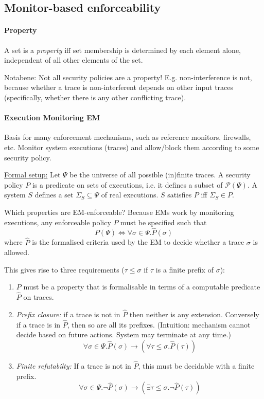 \subsection{Monitor-based enforceability}

\paragraph{Property} A set is a \emph{property} iff set membership is determined by each element alone, independent of all other elements of the set.

Notabene: Not all security policies are a property! E.g. non-interference is not, because whether a trace is non-interferent depends on other input traces (specifically, whether there is any other conflicting trace).

\paragraph{Execution Monitoring EM} Basis for many enforcement mechanisms, such as reference monitors, firewalls, etc. Monitor system executions (traces) and allow/block them according to some security policy.

\underline{Formal setup:}
Let $\Psi$ be the universe of all possible (in)finite traces. A security policy $P$ is a predicate on sets of executions, i.e. it defines a subset of $\mathcal{P}(\Psi)$. A system $S$ defines a set $\Sigma_S \subseteq \Psi$ of real executions. $S$ satisfies $P$ iff $\Sigma_S \in P$.

Which properties are EM-enforceable? Because EMs work by monitoring executions, any enforceable policy $P$ must be specified such that
$$ P(\Psi) \Leftrightarrow \forall \sigma \in \Psi . \hat{P}(\sigma) $$
where $\hat{P}$ is the formalised criteria used by the EM to decide whether a trace $\sigma$ is allowed.

This gives rise to three requirements ($\tau \leq \sigma$ if $\tau$ is a finite prefix of $\sigma$):
\begin{enumerate}
    \item $P$ must be a property that is formalisable in terms of a computable predicate $\hat{P}$ on traces.
    \item \emph{Prefix closure:} if a trace is not in $\hat{P}$ then neither is any extension. Conversely if a trace is in $\hat{P}$, then so are all its prefixes.
    (Intuition: mechanism cannot decide based on future actions. System may terminate at any time.)
    $$ \forall \sigma \in \Psi . \hat{P}(\sigma) \rightarrow (\forall \tau \leq \sigma . \hat{P}(\tau)) $$
    \item \emph{Finite refutabilty:} If a trace is not in $\hat{P}$, this must be decidable with a finite prefix.
    $$ \forall \sigma \in \Psi . \neg \hat{P}(\sigma) \rightarrow (\exists \tau \leq \sigma . \neg \hat{P}(\tau)) $$
\end{enumerate}

